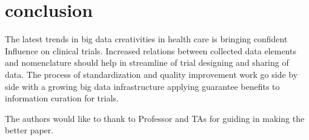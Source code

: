 \documentclass[sigconf]{acmart}
\begin{document}
\section{conclusion}
The latest trends in big data creativities in health care is bringing 
confident Influence on clinical trials.  Increased relations between 
collected data elements and nomenclature should help in streamline of
trial designing and sharing of data. The process of standardization and
quality improvement work go side by side with a growing big data 
infrastructure applying guarantee benefits to information curation
for trials.

\begin{acks}

The authors would like to thank to Professor and TAs for guiding in
making the better paper.

\end{acks}


 
\end{document}
